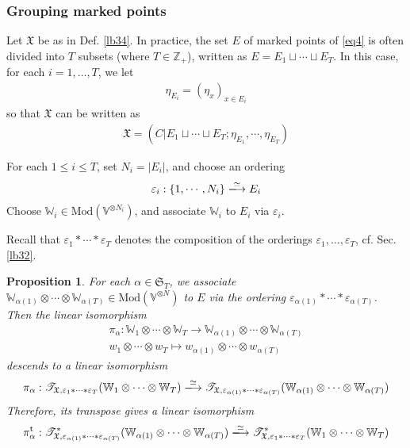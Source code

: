 \documentclass[11pt,b5paper,notitlepage]{article}
\theoremstyle{definition}
\theoremstyle{plain}
\newtheorem{pp}[df]{Proposition}
\newcommand{\fk}{\mathfrak}
\newcommand{\tr}{\mathrm{t}} %
\newcommand{\Vbb}{\mathbb V}
\newcommand{\Wbb}{\mathbb W}
\newcommand{\Zbb}{\mathbb Z}
\newcommand{\<}{\left\langle}
\renewcommand{\>}{\right\rangle}
\newcommand{\fx}{\mathfrak{X}}
\newcommand{\ST}{\mathscr{T}}
\newcommand{\Mod}{\mathrm{Mod}}
\newcommand{\eps}{\varepsilon}
\numberwithin{equation}{section}
\begin{document}
	

 \subsubsection{Grouping marked points}

Let $\fx$ be as in Def. \ref{lb34}. In practice, the set $E$ of marked points of \eqref{eq4} is often divided into $T$ subsets (where $T\in\Zbb_+$), written as $E=E_1\sqcup\cdots\sqcup E_T$. In this case, for each $i=1,\dots,T$, we let
\begin{align}
\eta_{E_i}=(\eta_x)_{x\in E_i}
\end{align}
so that $\fx$ can be written as
 \begin{align}
	\fx=(C\big|E_1\sqcup \cdots \sqcup E_T;\eta_{E_1},\cdots,\eta_{E_T})
 \end{align}



For each $1\leq i\leq T$, set $N_i=|E_i|$, and choose an ordering
\begin{align*}
	\eps_i:\{1,\cdots,N_i\}\xlongrightarrow{\simeq} E_i
\end{align*}
Choose $\Wbb_i\in \Mod(\Vbb^{\otimes N_i})$, and associate $\Wbb_i$ to $E_i$ via $\eps_i$.

Recall that $\eps_1*\cdots*\eps_T$ denotes the composition of the orderings $\eps_1,\dots,\eps_T$, cf. Sec. \ref{lb32}.

\begin{pp}\label{lb10}
For each $\alpha\in \fk S_T$, we associate $\Wbb_{\alpha(1)}\otimes \cdots \otimes \Wbb_{\alpha(T)}\in \Mod(\Vbb^{\otimes N})$ to $E$ via the ordering $\eps_{\alpha(1)}*\cdots*\eps_{\alpha(T)}$. Then the linear isomorphism
\begin{gather*}
\pi_\alpha:\Wbb_1\otimes \cdots \otimes \Wbb_T\rightarrow \Wbb_{\alpha(1)}\otimes \cdots \otimes \Wbb_{\alpha(T)}\\
w_1\otimes \cdots \otimes w_T\mapsto w_{\alpha(1)}\otimes \cdots \otimes w_{\alpha(T)}
\end{gather*}
descends to a linear isomorphism
\begin{align*}
\pi_\alpha:\ST_{\fx,\eps_{1}*\cdots*\eps_{T}}(\Wbb_{1}\otimes \cdots \otimes \Wbb_{T})\xlongrightarrow{\simeq}\ST_{\fx,\eps_{\alpha(1)}*\cdots*\eps_{\alpha(T)}}(\Wbb_{\alpha(1)}\otimes \cdots \otimes \Wbb_{\alpha(T)})
\end{align*}
Therefore, its transpose gives a linear isomorphism
	\begin{align*}
\pi_\alpha^\tr:		\ST_{\fx,\eps_{\alpha(1)}*\cdots*\eps_{\alpha(T)}}^*(\Wbb_{\alpha(1)}\otimes \cdots \otimes \Wbb_{\alpha(T)})\xlongrightarrow{\simeq} \ST_{\fx,\eps_{1}*\cdots*\eps_{T}}^*(\Wbb_{1}\otimes \cdots \otimes \Wbb_{T})
	\end{align*}
\end{pp}
\end{document}
